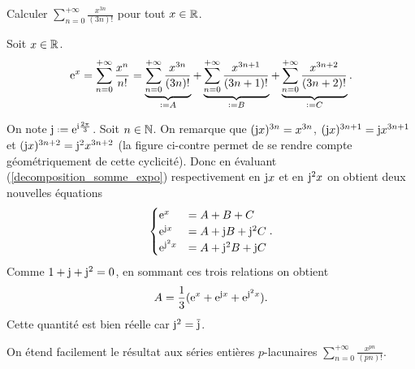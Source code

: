 \begin{exercice}
Calculer $\sum\limits_{n=0}^{+ \infty} \frac{x^{3n}}{(3n)!}$ pour tout $x \in \mathbb{R}$.
\end{exercice}

\begin{solution}
Soit $x \in \mathbb{R}$. 
\begin{align} \label{decomposition_somme_expo}
    \me^x = \sum_{n=0}^{+ \infty} \frac{x^n}{n!} = \underbrace{\sum_{n=0}^{+ \infty} \frac{x^{3n}}{(3n)!}}_{ \defeq A} + \underbrace{\sum_{n=0}^{+ \infty} \frac{x^{3n+1}}{(3n+1)!}}_{\defeq B} + \underbrace{\sum_{n=0}^{+ \infty} \frac{x^{3n+2}}{(3n+2)!}}_{\defeq C}.
\end{align}

\begin{marginfigure}
    
\end{marginfigure}

On note $\mj \defeq \me^{\mi \frac{2\pi}{3}}$. Soit $n \in \mathbb{N}$. On remarque que $(\mathrm{j} x)^{3n} = x^{3n}$, $(\mathrm{j} x)^{3n+1} = \mathrm{j} x^{3n+1}$ et $(\mathrm{j} x)^{3n+2} = \mathrm{j}^2 x^{3n+2}$ (la figure ci-contre permet de se rendre compte géométriquement de cette cyclicité). Donc en évaluant (\ref{decomposition_somme_expo}) respectivement en $\mathrm{j} x$ et en $\mathrm{j}^2 x$ on obtient deux nouvelles équations
$$\begin{cases}
    \mathrm{e}^x &= A + B + C \\
    \mathrm{e}^{\mathrm{j} x} &= A + \mathrm{j} B + \mathrm{j}^2 C \\
    \mathrm{e}^{\mathrm{j}^2 x} &= A + \mathrm{j}^2 B + \mathrm{j} C
\end{cases}.$$
Comme $1 + \mathrm{j} + \mathrm{j}^2 = 0$, en sommant ces trois relations on obtient
$$A = \frac{1}{3}(\mathrm{e}^x + \mathrm{e}^{\mathrm{j} x}+ \mathrm{e}^{\mathrm{j}^2 x}).$$
Cette quantité est bien réelle car $\mathrm{j}^2 = \overline{\mathrm{j}}$.
\end{solution}

\begin{remarque}
    On étend facilement le résultat aux séries entières $p$-lacunaires $\sum\limits_{n=0}^{+ \infty} \frac{x^{pn}}{(pn)!}$.
\end{remarque}